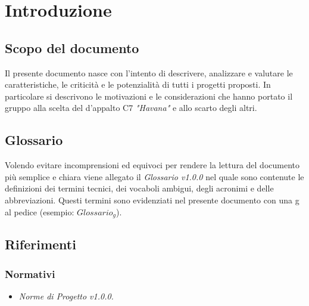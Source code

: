 \section{Introduzione}
	\subsection{Scopo del documento}
	Il presente documento nasce con l'intento di descrivere, analizzare e valutare le caratteristiche, le criticità e le potenzialità di tutti i progetti proposti. In particolare si descrivono le motivazioni e le considerazioni che hanno portato il gruppo alla scelta del  d'appalto C7 \emph{"Havana"} e allo scarto degli altri.
	\subsection{Glossario}
	Volendo evitare incomprensioni  ed equivoci per rendere la lettura del documento più semplice e chiara viene allegato il \emph{Glossario v1.0.0} nel quale sono contenute le definizioni dei termini tecnici, dei vocaboli ambigui, degli acronimi e delle abbreviazioni. Questi termini sono evidenziati nel presente documento con una g al pedice (esempio: $Glossario_{g}$).  
	\subsection{Riferimenti}
		\subsubsection{Normativi}
		\begin{itemize}
			\item \emph{Norme di Progetto v1.0.0.}
		\end{itemize}
		
